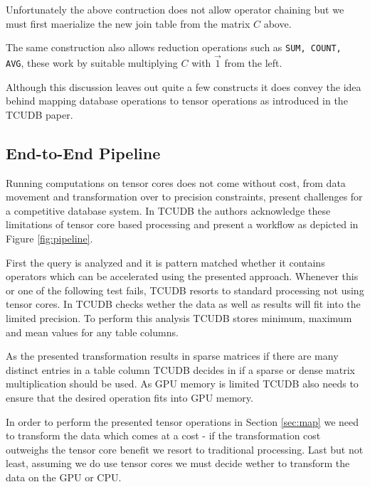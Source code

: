 \documentclass{paper}
\begin{document}
Unfortunately the above contruction does not allow operator chaining but we must first maerialize the new join table from the matrix $C$ above.

The same construction also allows reduction operations such as \texttt{SUM, COUNT, AVG}, these work by suitable multiplying $C$ with $\vec{1}$ from the left.

Although this discussion leaves out quite a few constructs it does convey the idea behind mapping database operations to tensor operations as introduced in the TCUDB paper.

	\subsection{End-to-End Pipeline}
	
	Running computations on tensor cores does not come without cost, from data movement and transformation over to precision constraints, present challenges for a competitive database system. In TCUDB the authors acknowledge these limitations of tensor core based processing and present a workflow as depicted in Figure \ref{fig:pipeline}.

	First the query is analyzed  and it is pattern matched whether it contains operators which can be accelerated using the presented approach. Whenever this or one of the following test fails, TCUDB resorts to standard processing not using tensor cores. In  TCUDB checks wether the data as well as results will fit into the limited precision. To perform this analysis TCUDB stores minimum, maximum and mean values for any table columns.
	
	As the presented transformation results in sparse matrices if there are many distinct entries in a table column TCUDB decides in  if a sparse or dense matrix multiplication should be used. As GPU memory is limited TCUDB also needs to ensure that  the desired operation fits into GPU memory.
	
	In order to perform the presented tensor operations in Section \ref{sec:map} we need to transform the data which comes at a cost - if the transformation cost outweighs the tensor core benefit  we resort to traditional processing. Last but not least, assuming we do use tensor cores we must decide  wether to transform the data on the GPU or CPU.
	
\end{document}
